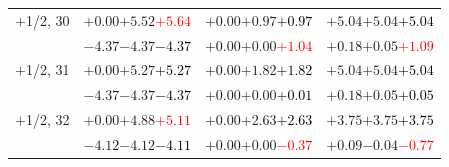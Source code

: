 \documentclass[compress]{beamer}
\begin{document}
\begin{frame}
\begin{tabular}{r | c | c | c}
$+$1/2, 30 & $+0.00$\hspace{0.1 cm}$+5.52$\hspace{0.1 cm}\textcolor{red}{$+5.64$} & $+0.00$\hspace{0.1 cm}$+0.97$\hspace{0.1 cm}\textcolor{black}{$+0.97$} & $+5.04$\hspace{0.1 cm}$+5.04$\hspace{0.1 cm}\textcolor{black}{$+5.04$} \\
           & $-4.37$\hspace{0.1 cm}$-4.37$\hspace{0.1 cm}\textcolor{black}{$-4.37$} & $+0.00$\hspace{0.1 cm}$+0.00$\hspace{0.1 cm}\textcolor{red}{$+1.04$} & $+0.18$\hspace{0.1 cm}$+0.05$\hspace{0.1 cm}\textcolor{red}{$+1.09$} \\
$+$1/2, 31 & $+0.00$\hspace{0.1 cm}$+5.27$\hspace{0.1 cm}\textcolor{black}{$+5.27$} & $+0.00$\hspace{0.1 cm}$+1.82$\hspace{0.1 cm}\textcolor{black}{$+1.82$} & $+5.04$\hspace{0.1 cm}$+5.04$\hspace{0.1 cm}\textcolor{black}{$+5.04$} \\
           & $-4.37$\hspace{0.1 cm}$-4.37$\hspace{0.1 cm}\textcolor{black}{$-4.37$} & $+0.00$\hspace{0.1 cm}$+0.00$\hspace{0.1 cm}\textcolor{black}{$+0.01$} & $+0.18$\hspace{0.1 cm}$+0.05$\hspace{0.1 cm}\textcolor{black}{$+0.05$} \\
$+$1/2, 32 & $+0.00$\hspace{0.1 cm}$+4.88$\hspace{0.1 cm}\textcolor{red}{$+5.11$} & $+0.00$\hspace{0.1 cm}$+2.63$\hspace{0.1 cm}\textcolor{black}{$+2.63$} & $+3.75$\hspace{0.1 cm}$+3.75$\hspace{0.1 cm}\textcolor{black}{$+3.75$} \\
           & $-4.12$\hspace{0.1 cm}$-4.12$\hspace{0.1 cm}\textcolor{black}{$-4.11$} & $+0.00$\hspace{0.1 cm}$+0.00$\hspace{0.1 cm}\textcolor{red}{$-0.37$} & $+0.09$\hspace{0.1 cm}$-0.04$\hspace{0.1 cm}\textcolor{red}{$-0.77$} \\

\end{tabular}
\end{frame}
\end{document}
